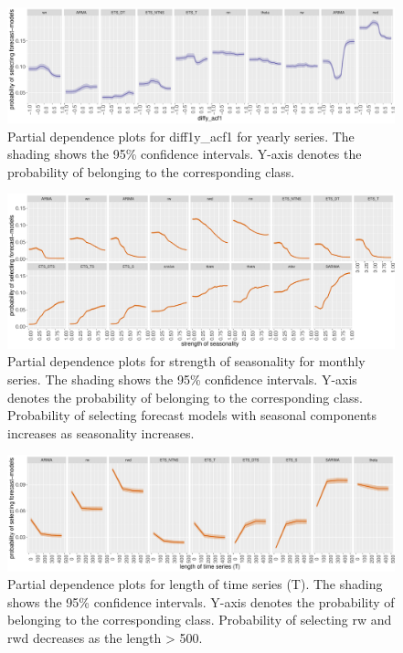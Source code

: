 \documentclass[11pt,a4paper,]{article}
\begin{document}
\begin{figure}[h]

{\centering \includegraphics[width=\textwidth]{figure/diff1yacf1y-1} 

}

\caption{Partial dependence plots for diff1y\_acf1 for yearly series. The shading shows the 95\% confidence intervals. Y-axis denotes the probability of belonging to the corresponding class.}\label{fig:diff1yacf1y}
\end{figure}

\begin{figure}[h]

{\centering \includegraphics[width=\textwidth]{figure/pdpmonthlyseasonality-1} 

}

\caption{Partial dependence plots for strength of seasonality for monthly series. The shading shows the 95\% confidence intervals. Y-axis denotes the probability of belonging to the corresponding class. Probability of selecting forecast models with seasonal components increases as seasonality increases.}\label{fig:pdpmonthlyseasonality}
\end{figure}

\begin{figure}[h]

{\centering \includegraphics[width=\textwidth]{figure/pdpmonthlyT-1} 

}

\caption{Partial dependence plots for length of time series (T). The shading shows the 95\% confidence intervals. Y-axis denotes the probability of belonging to the corresponding class. Probability of selecting rw and rwd decreases as the length > 500.}\label{fig:pdpmonthlyT}
\end{figure}
\end{document}
